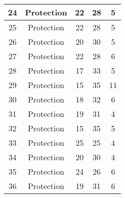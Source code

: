 \documentclass[results.tex]{subfiles}
\begin{document}
\begin{center}
\begin{tabular}{| c || c | c | c | c |}
            \hline
            24                      & Protection                   & 22                     & 28                      & 5                    \\
            \hline
            25                      & Protection                   & 22                     & 28                      & 5                    \\
            \hline
            26                      & Protection                   & 20                     & 30                      & 5                    \\
            \hline
            27                      & Protection                   & 22                     & 28                      & 6                    \\
            \hline
            28                      & Protection                   & 17                     & 33                      & 5                    \\
            \hline
            29                      & Protection                   & 15                     & 35                      & 11                   \\
            \hline
            30                      & Protection                   & 18                     & 32                      & 6                    \\
            \hline
            31                      & Protection                   & 19                     & 31                      & 4                    \\
            \hline
            32                      & Protection                   & 15                     & 35                      & 5                    \\
            \hline
            33                      & Protection                   & 25                     & 25                      & 4                    \\
            \hline
            34                      & Protection                   & 20                     & 30                      & 4                    \\
            \hline
            35                      & Protection                   & 24                     & 26                      & 6                    \\
            \hline
            36                      & Protection                   & 19                     & 31                      & 6                    \\

\end{tabular}
\end{center}
\end{document}
